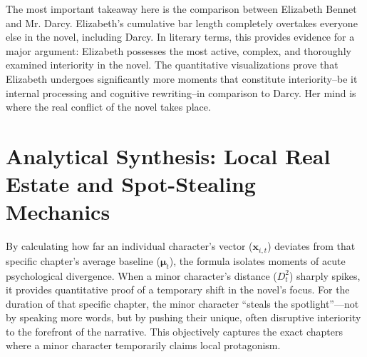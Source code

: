 The most important takeaway here is the comparison between Elizabeth Bennet and Mr. Darcy. Elizabeth’s cumulative bar length completely overtakes everyone else in the novel, including Darcy. In literary terms, this provides evidence for a major argument: Elizabeth possesses the most active, complex, and thoroughly examined interiority in the novel. The quantitative visualizations prove that Elizabeth undergoes significantly more moments that constitute interiority--be it internal processing and cognitive rewriting--in comparison to Darcy. Her mind is where the real conflict of the novel takes place.

\section{Analytical Synthesis: Local Real Estate and Spot-Stealing Mechanics}
By calculating how far an individual character’s vector ($\mathbf{x}_{i,t}$) deviates from that specific chapter's average baseline ($\boldsymbol{\mu}_t$), the formula isolates moments of acute psychological divergence. When a minor character's distance ($D_t^2$) sharply spikes, it provides quantitative proof of a temporary shift in the novel's focus. For the duration of that specific chapter, the minor character ``steals the spotlight''---not by speaking more words, but by pushing their unique, often disruptive interiority to the forefront of the narrative. This objectively captures the exact chapters where a minor character temporarily claims local protagonism.

